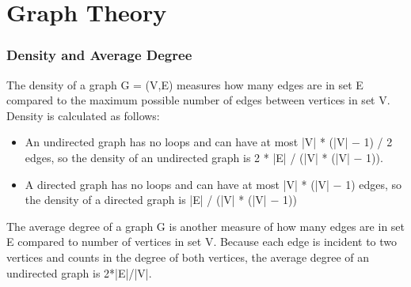 \documentclass{beamer}
\begin{document}
\section{Graph Theory}
\begin{frame}
\frametitle{Density and Average Degree}

 The density of a graph G = (V,E) measures how many edges are in set E compared to the maximum possible number of edges between vertices in set V. Density is calculated as follows:
\begin{itemize}

\item
An undirected graph has no loops and can have at most |V| * (|V| − 1) / 2 edges, so the density of an undirected graph is 2 * |E| / (|V| * (|V| − 1)).
\item A directed graph has no loops and can have at most |V| * (|V| − 1) edges, so the density of a directed graph is |E| / (|V| * (|V| − 1))
\end{itemize}
The average degree of a graph G is another measure of how many edges are in set E compared to number of vertices in set V. Because each edge is incident to two vertices and counts in the degree of both vertices, the average degree of an undirected graph is 2*|E|/|V|.

\end{frame}
\end{document}
